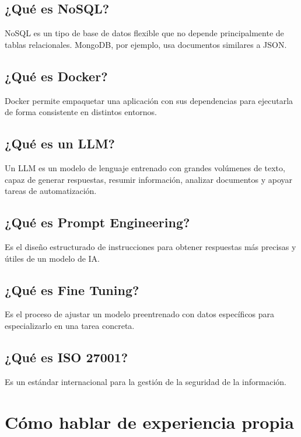 \documentclass[12pt]{article}
\begin{document}
\subsection{¿Qué es NoSQL?}

NoSQL es un tipo de base de datos flexible que no depende principalmente de tablas relacionales. MongoDB, por ejemplo, usa documentos similares a JSON.

\subsection{¿Qué es Docker?}

Docker permite empaquetar una aplicación con sus dependencias para ejecutarla de forma consistente en distintos entornos.

\subsection{¿Qué es un LLM?}

Un LLM es un modelo de lenguaje entrenado con grandes volúmenes de texto, capaz de generar respuestas, resumir información, analizar documentos y apoyar tareas de automatización.

\subsection{¿Qué es Prompt Engineering?}

Es el diseño estructurado de instrucciones para obtener respuestas más precisas y útiles de un modelo de IA.

\subsection{¿Qué es Fine Tuning?}

Es el proceso de ajustar un modelo preentrenado con datos específicos para especializarlo en una tarea concreta.

\subsection{¿Qué es ISO 27001?}

Es un estándar internacional para la gestión de la seguridad de la información.

\section{Cómo hablar de experiencia propia}
\end{document}
